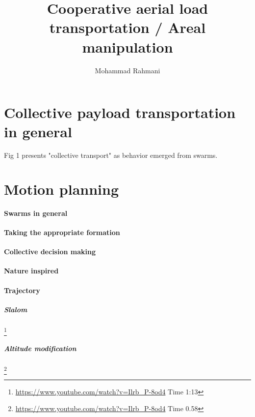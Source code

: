 \documentclass{article}
\begin{document}
	
	\title{Cooperative aerial load transportation / Areal manipulation}
	\author{Mohammad Rahmani}
	\date{}
	\maketitle
	\section{Collective payload transportation in general}
		\cite{brambilla-2013-swarm-robotics-a-review-from-the-swarm-engineering-perspective} Fig 1 presents "collective transport" as behavior emerged from swarms.  
	\section{Motion planning}
		\paragraph{Swarms in general}
			\cite{medina-2018-robotic-swarm-motion-planning-for-load-carrying-and-manipulating}
		\paragraph{Taking the appropriate formation}
			\cite{vasarhelyi-2014-outdoor-flocking-and-formation-flight-with-autonomous-aerial-robots}
			\cite{soria-2020-swarmlab-a-matlab-drone-swarm-simulator}
		\paragraph {Collective decision making}
			\cite{han-2010-collective-decision-making-in-multi-agent-systems-by-implicit-leadership}
		\paragraph {Nature inspired}
			\cite{gelblum-2017-ant-groups-optimally-amplify-the-effect-of-transiently-informed-individuals}
		\paragraph{Trajectory}
			\subparagraph{Slalom}
			\cite{loianno-2017-cooperative-transportation-using-small-quadrotors-using-monocular-vision-and-inertial-sensing}\footnote{\url{https://www.youtube.com/watch?v=Ilrb_P-8od4} Time 1:13}
			\subparagraph{Altitude modification}
			\cite{loianno-2017-cooperative-transportation-using-small-quadrotors-using-monocular-vision-and-inertial-sensing}\footnote{\url{https://www.youtube.com/watch?v=Ilrb_P-8od4} Time 0.58}
\end{document}
